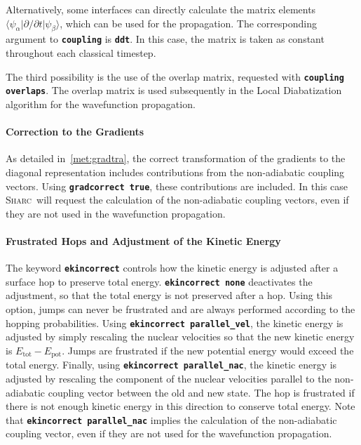 \documentclass[a4paper,11pt,DIV=15,openany,twoside=false]{scrbook}
\newcommand{\sharc}{\textsc{Sharc}}
\newcommand{\ttt}[1]{\textbf{\texttt{#1}}}
\begin{document}
Alternatively, some interfaces can directly calculate the matrix elements $\langle\psi_\alpha|\partial/\partial t|\psi_\beta\rangle$, which can be used for the propagation. The corresponding argument to \ttt{coupling} is \ttt{ddt}. In this case, the matrix is taken as constant throughout each classical timestep.

The third possibility is the use of the overlap matrix, requested with \ttt{coupling overlaps}. The overlap matrix is used subsequently in the Local Diabatization algorithm for the wavefunction propagation.

\paragraph{Correction to the Gradients}

As detailed in~\ref{met:gradtra}, the correct transformation of the gradients to the diagonal representation includes contributions from the non-adiabatic coupling vectors. Using \ttt{gradcorrect true}, these contributions are included. In this case \sharc\ will request the calculation of the non-adiabatic coupling vectors, even if they are not used in the wavefunction propagation. 

\paragraph{Frustrated Hops and Adjustment of the Kinetic Energy}

The keyword \ttt{ekincorrect} controls how the kinetic energy is adjusted after a surface hop to preserve total energy. \ttt{ekincorrect none} deactivates the adjustment, so that the total energy is not preserved after a hop. Using this option, jumps can never be frustrated and are always performed according to the hopping probabilities. 
Using \ttt{ekincorrect parallel\_vel}, the kinetic energy is adjusted by simply rescaling the nuclear velocities so that the new kinetic energy is $E_{\text{tot}}-E_{\text{pot}}$. Jumps are frustrated if the new potential energy would exceed the total energy.
Finally, using \ttt{ekincorrect parallel\_nac}, the kinetic energy is adjusted by rescaling the component of the nuclear velocities parallel to the non-adiabatic coupling vector between the old and new state. The hop is frustrated if there is not enough kinetic energy in this direction to conserve total energy. Note that \ttt{ekincorrect parallel\_nac} implies the calculation of the non-adiabatic coupling vector, even if they are not used for the wavefunction propagation.
\end{document}
